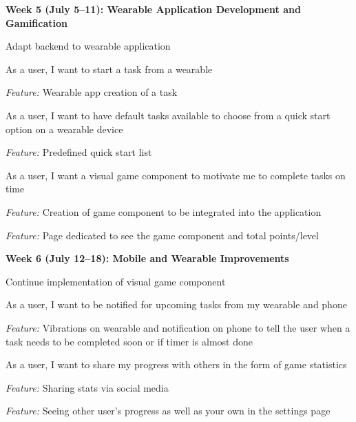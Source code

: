 \documentclass{sigchi}
\begin{document}
\begin{myitemize}
	\item \textbf{Week 5 (July 5--11): Wearable Application Development and Gamification}
	\begin{myitemize}
		\item Adapt backend to wearable application
		\item As a user, I want to start a task from a wearable
		\begin{myitemize}
			\item \textit{Feature:} Wearable app creation of a task
		\end{myitemize}
		\item As a user, I want to have default tasks available to choose from a quick start option on a wearable device
		\begin{myitemize}
			\item \textit{Feature:} Predefined quick start list
		\end{myitemize}
		\item As a user, I want a visual game component to motivate me to complete tasks on time
		\begin{myitemize}
			\item \textit{Feature:} Creation of game component to be integrated into the application
			\item \textit{Feature:} Page dedicated to see the game component and total points/level
		\end{myitemize}
	\end{myitemize}
	
	\item \textbf{Week 6 (July 12--18): Mobile and Wearable Improvements}
	\begin{myitemize}
		\item Continue implementation of visual game component
		\item As a user, I want to be notified for upcoming tasks from my wearable and phone
		\begin{myitemize}
			\item \textit{Feature:} Vibrations on wearable and notification on phone to tell the user when a task needs to be completed soon or if timer is almost done
		\end{myitemize}
		\item As a user, I want to share my progress with others in the form of game statistics
		\begin{myitemize}
			\item \textit{Feature:} Sharing stats via social media
			\item \textit{Feature:} Seeing other user’s progress as well as your own in the settings page
		\end{myitemize}
	\end{myitemize}
	

\end{myitemize}
\end{document}
